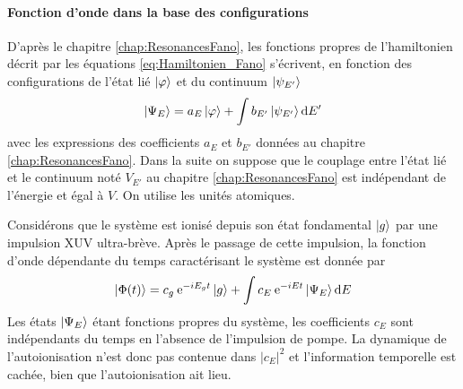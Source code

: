 \paragraph{Fonction d'onde dans la base des configurations} D'après le chapitre \ref{chap:ResonancesFano}, les fonctions propres de l'hamiltonien décrit par les équations \ref{eq:Hamiltonien_Fano} s'écrivent, en fonction des configurations de l'état lié $\ket{\varphi}$ et du continuum $ \ket{\psi_{E'}}$
\begin{equation}
\ket{\Psi_E} = a_E \ket{\varphi} + \int b_{E'} \ket{\psi_{E'}} \mathrm{d} E'
\end{equation}
avec les expressions des coefficients $a_E$ et $b_{E'}$ données au chapitre \ref{chap:ResonancesFano}. Dans la suite on suppose que le couplage entre l'état lié et le continuum noté $V_{E'}$ au chapitre  \ref{chap:ResonancesFano} est indépendant de l'énergie et égal à $V$. On utilise les unités atomiques.

Considérons que le système est ionisé depuis son état fondamental $\ket{g}$ par une impulsion XUV ultra-brève. Après le passage de cette impulsion, la fonction d'onde dépendante du temps caractérisant le système est donnée par
\begin{equation}
\ket{\Phi (t)} = c_g \: \mathrm{e}^{-i E_g t} \ket{g} + \int c_E \: \mathrm{e}^{-iEt} \ket{\Psi_E} \mathrm{d} E
\end{equation}
Les états $\ket{\Psi_E}$ étant fonctions propres du système, les coefficients $c_E$ sont indépendants du temps en l'absence de l'impulsion de pompe. La dynamique de l'autoionisation n'est donc pas contenue dans $|c_E|^2$ et l'information temporelle est cachée, bien que l'autoionisation ait lieu.

